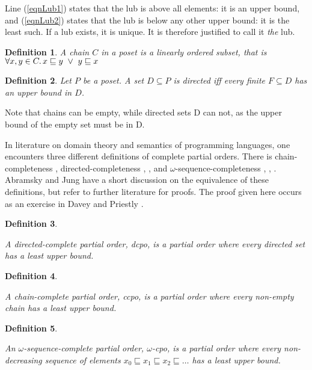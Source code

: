 \documentclass[a4paper]{article}
\newcommand{\below}{\sqsubseteq}
\newcommand{\oor}{\ \vee \ }
\newtheorem{definition}{Definition}[section]
\begin{document}
Line (\ref{eqnLub1}) states that the lub is above all elements: it is an upper
bound, and (\ref{eqnLub2}) states that the lub is below any other upper bound:
it is the least such. If a lub exists, it is unique. It is therefore justified
to call it \emph{the} lub.


\begin{definition}

A \emph{chain} $C$ in a poset is a linearly ordered subset, that is
$\forall x,y \in C \ldotp x \below y \oor y \below x$

\end{definition}


\begin{definition}

Let $P$ be a poset. A set $D \subseteq P$ is \emph{directed} iff every finite
$F \subseteq D$ has an upper bound in $D$.

\end{definition}

Note that chains can be empty, while directed sets D can not, as the upper bound
of the empty set must be in D.

In literature on domain theory and semantics of programming languages, one
encounters three different definitions of complete partial orders.  There is
chain-completeness \cite{Moschovakis1994}, directed-completeness
\cite{DaveyPriestly1990}, \cite{Gunter1992}, and $\omega$-sequence-completeness
\cite{Allison1986}, \cite{Winskel1993}, \cite{BarrWells1990}. Abramsky and Jung
\cite{Abramsky1994} have a short discussion on the equivalence of these
definitions, but refer to further literature for proofs. The proof given here
occurs as an exercise in Davey and Priestly \cite{DaveyPriestly1990}.


\begin{definition} \label{defCpoDirectedComplete}

A directed-complete partial order, \emph{dcpo}, is a partial order where every
directed set has a least upper bound.

\end{definition}


\begin{definition} \label{defCpoChainComplete}

A chain-complete partial order, \emph{ccpo}, is a partial order where every
non-empty chain has a least upper bound.

\end{definition}


\begin{definition} \label{defCpoOmegaSequenceComplete}

An $\omega$-sequence-complete partial order, \emph{$\omega$-cpo}, is a partial
order where every non-decreasing sequence of elements $x_0 \below x_1 \below x_2
\below \ldots $ has a least upper bound.

\end{definition}
\end{document}
